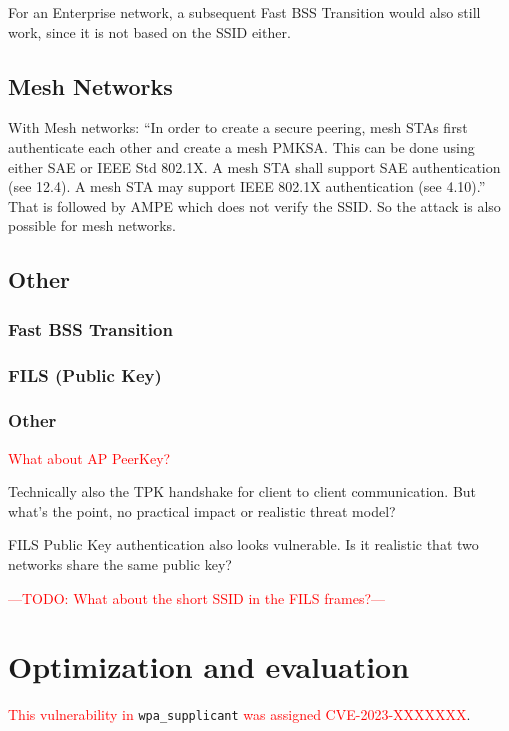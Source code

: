 \documentclass[sigconf,review]{acmart}
\DeclareRobustCommand{\red}[1]{\textcolor{red}{#1}}
\begin{document}
For an Enterprise network, a subsequent Fast BSS Transition would also still work, since it is not based on the SSID either.

\subsection{Mesh Networks}

With Mesh networks: ``In order to create a secure peering, mesh STAs first authenticate each other and create a mesh PMKSA. This can be done using either SAE or IEEE Std 802.1X. A mesh STA shall support SAE authentication (see 12.4). A mesh STA may support IEEE 802.1X authentication (see 4.10).''
That is followed by AMPE which does not verify the SSID.
So the attack is also possible for mesh networks.

\subsection{Other}

\subsubsection{Fast BSS Transition}

\subsubsection{FILS (Public Key)}

\subsubsection{Other}

\red{What about AP PeerKey?}

Technically also the TPK handshake for client to client communication.
But what's the point, no practical impact or realistic threat model?

FILS Public Key authentication also looks vulnerable.
Is it realistic that two networks share the same public key?

\red{---TODO: What about the short SSID in the FILS frames?---}

\section{Optimization and evaluation}
\label{sec:evaluation}

\red{This vulnerability in} \verb|wpa_supplicant| \red{was assigned CVE-2023-XXXXXXX}.
\end{document}
